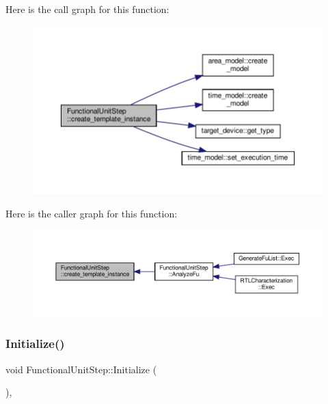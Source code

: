Here is the call graph for this function\+:
\nopagebreak
\begin{figure}[H]
\begin{center}
\leavevmode
\includegraphics[width=350pt]{d0/db7/classFunctionalUnitStep_a49ddb30d5388317d1ca7b69455aaeff0_cgraph}
\end{center}
\end{figure}
Here is the caller graph for this function\+:
\nopagebreak
\begin{figure}[H]
\begin{center}
\leavevmode
\includegraphics[width=350pt]{d0/db7/classFunctionalUnitStep_a49ddb30d5388317d1ca7b69455aaeff0_icgraph}
\end{center}
\end{figure}
\mbox{\label{classFunctionalUnitStep_a7957c47789e5d4a97eb9315872dc8d37}} 
\subsubsection{\texorpdfstring{Initialize()}{Initialize()}}
{\footnotesize\ttfamily void Functional\+Unit\+Step\+::\+Initialize (\begin{DoxyParamCaption}{ }\end{DoxyParamCaption})\hspace{0.3cm}{\ttfamily [override]}, {\ttfamily [virtual]}}



